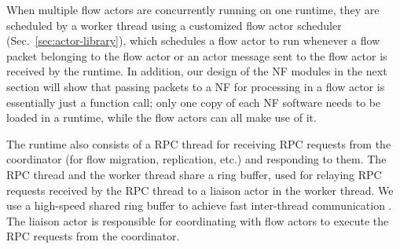 When multiple flow actors are concurrently running on one runtime, they are scheduled by a worker thread using a customized flow actor scheduler (Sec.~\ref{sec:actor-library}), which schedules a flow actor to run whenever a flow packet belonging to the flow actor or an actor message sent to the flow actor is received by the runtime. %
In addition, our design of the NF modules in the next section will show that passing packets to a NF for processing in a flow actor is essentially just a function call; only one copy of each NF software needs to be loaded in a runtime, while the flow actors can all make use of it. %



The runtime also consists of a RPC thread for receiving RPC requests from the coordinator (for flow migration, replication, etc.) and responding to them. The RPC thread and the worker thread share a ring buffer, used for relaying RPC requests received by the RPC thread to a liaison actor in the worker thread. We use a high-speed shared ring buffer to achieve fast inter-thread communication \cite{dpdk} %
. The liaison actor is responsible for coordinating with flow actors to execute the RPC requests from the coordinator. %






